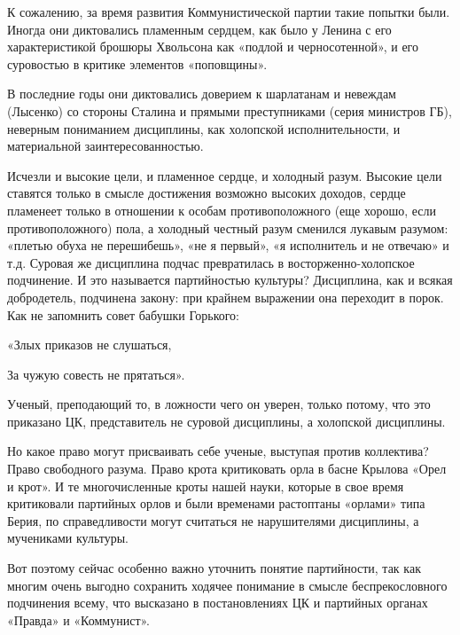 К сожалению, за время развития Коммунистической партии такие попытки
были. Иногда они диктовались пламенным сердцем, как было у Ленина с
его характеристикой брошюры Хвольсона как «подлой и черносотенной», и
его суровостью в критике элементов «поповщины».

В последние годы они диктовались доверием к шарлатанам и невеждам
(Лысенко) со стороны Сталина и прямыми преступниками (серия министров
ГБ), неверным пониманием дисциплины, как холопской исполнительности, и
материальной заинтересованностью.

Исчезли и высокие цели, и пламенное сердце, и холодный разум. Высокие
цели ставятся только в смысле достижения возможно высоких доходов,
сердце пламенеет только в отношении к особам противоположного (еще
хорошо, если противоположного) пола, а холодный честный разум сменился
лукавым разумом: «плетью обуха не перешибешь», «не я первый», «я
исполнитель и не отвечаю» и т.д. Суровая же дисциплина подчас
превратилась в восторженно-холопское подчинение. И это называется
партийностью культуры? Дисциплина, как и всякая добродетель, подчинена
закону: при крайнем выражении она переходит в порок. Как не запомнить
совет бабушки Горького:



«Злых приказов не слушаться,

За чужую совесть не прятаться».



Ученый, преподающий то, в ложности чего он уверен, только потому, что
это приказано ЦК, представитель не суровой дисциплины, а холопской
дисциплины.

Но какое право могут присваивать себе ученые, выступая против
коллектива? Право свободного разума. Право крота критиковать орла в
басне Крылова «Орел и крот». И те многочисленные кроты нашей науки,
которые в свое время критиковали партийных орлов и были временами
растоптаны «орлами» типа Берия, по справедливости могут считаться не
нарушителями дисциплины, а мучениками культуры.

Вот поэтому сейчас особенно важно уточнить понятие партийности, так
как многим очень выгодно сохранить ходячее понимание в смысле
беспрекословного подчинения всему, что высказано в постановлениях ЦК и
партийных органах «Правда» и «Коммунист».

